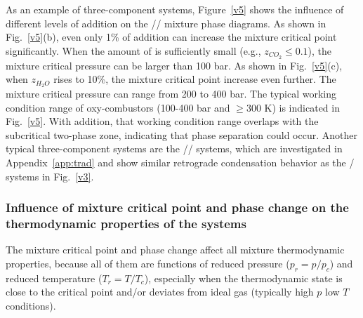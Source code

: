 As an example of three-component  systems, Figure~\ref{v5} shows the influence of different levels of  addition on the // mixture phase diagrams.
As shown in Fig.~\ref{v5}(b), even only 1\% of  addition can increase the mixture critical point significantly. When the amount of  is sufficiently small (e.g., $z_{CO_2}\leq0.1$), the mixture critical pressure can be larger than 100 bar. %
As shown in Fig.~\ref{v5}(c), when $z_{H_2O}$ rises to 10\%, the mixture critical point increase even further. The mixture critical pressure can range from 200 to 400 bar.
The typical working condition range of  oxy-combustors (100-400 bar and $\ge300$ K) is indicated in Fig.~\ref{v5}. With  addition, that working condition range overlaps with the subcritical two-phase zone, indicating that phase separation could occur.
Another typical three-component  systems are the // systems, which are investigated in Appendix~\ref{app:trad} and show similar retrograde condensation behavior as the / systems in Fig.~\ref{v3}.


\subsubsection{Influence of mixture critical point and phase change on the thermodynamic properties of the  systems}
\label{sec:results:combustor:phase}
The mixture critical point and phase change affect all mixture thermodynamic properties, because all of them are functions of reduced pressure ($p_r=p/p_c$) and reduced temperature ($T_r=T/T_c$), especially when the thermodynamic state is close to the critical point and/or deviates from ideal gas (typically high $p$ low $T$ conditions). %

